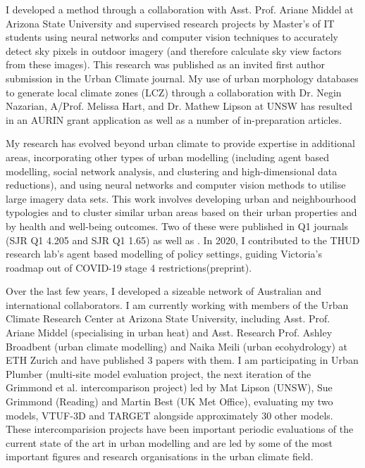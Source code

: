 I developed a method through a collaboration with Asst. Prof. Ariane Middel at Arizona State University and supervised research projects by Master's of IT students using neural networks and computer vision techniques to accurately detect sky pixels in outdoor imagery (and therefore calculate sky view factors from these images). This research was published as an invited first author submission\textbf{\cite{Nice2020}} in the Urban Climate journal. My use of urban morphology databases to generate local climate zones (LCZ) through a collaboration with Dr. Negin Nazarian, A/Prof. Melissa Hart, and Dr. Mathew Lipson at UNSW has resulted in an AURIN grant application as well as a number of in-preparation articles.

My research has evolved beyond urban climate to provide expertise in additional areas, incorporating other types of urban modelling (including agent based modelling, social network analysis, and clustering and high-dimensional data reductions), and using neural networks and computer vision methods to utilise large imagery data sets. This work involves developing urban and neighbourhood typologies and to cluster similar urban areas based on their urban properties and by health and well-being outcomes. Two of these were published in Q1 journals\textbf{\cite{Thompson2020,Wijnands2019}} (SJR Q1 4.205 and SJR Q1 1.65) as well as \textbf{\cite{Nice2020a}}. In 2020, I contributed to the THUD research lab's agent based modelling of policy settings, guiding Victoria's roadmap out of COVID-19 stage 4 restrictions\textbf{\cite{Thompson2020a}}(preprint). 

Over the last few years, I developed a sizeable network of Australian and international collaborators. I am currently working with members of the Urban Climate Research Center at Arizona State University, including Asst. Prof. Ariane Middel (specialising in urban heat) and Asst. Research Prof. Ashley Broadbent (urban climate modelling) and Naika Meili (urban ecohydrology) at ETH Zurich and have published 3 papers with them. I am participating in Urban Plumber (multi-site model evaluation project, the next iteration of the Grimmond et al.\cite{Grimmond2011} intercomparison project) led by Mat Lipson (UNSW), Sue Grimmond (Reading) and Martin Best (UK Met Office), evaluating my two models, VTUF-3D and TARGET alongside approximately 30 other models. These intercomparision projects have been important periodic evaluations of the current state of the art in urban modelling and are led by some of the most important figures and research organisations in the urban climate field. 

